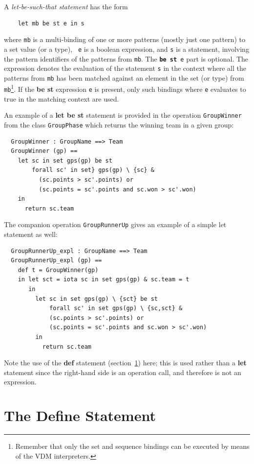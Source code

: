 \documentclass{overturerepchap}
\newcommand{\keyw}[1]{{\bf\ttfamily #1}}
\begin{document}
{\begin{description}
  A {\it let-be-such-that statement} has the form
  \begin{lstlisting}
    let mb be st e in s
  \end{lstlisting}
  where {\tt mb} is a multi-binding of one or more patterns (mostly
  just one pattern) to a set value (or a type), {\tt
    e} is a boolean expression, and {\tt s} is a statement, involving the
  pattern identifiers of the patterns from {\tt mb}. The {\tt \keyw{be st} e}
  part is optional. The expression denotes the evaluation of the statement
  {\tt s} in the context where all the patterns from {\tt mb} has been matched
  against an element in the set (or type) from {\tt mb}\footnote{Remember
    that only the set and sequence bindings can be executed by means of the
    VDM interpreters.}.
  If the \keyw{be st}
  expression {\tt e} is present, only such bindings where {\tt e} evaluates
  to true in the matching context are used.

\item[Examples:] An example of a \keyw{let be st} statement is provided in the
  operation \texttt{GroupWinner}
from the class \texttt{GroupPhase}
  which returns the winning team in a given group:
  \begin{lstlisting}
  GroupWinner : GroupName ==> Team
  GroupWinner (gp) ==
    let sc in set gps(gp) be st
        forall sc' in set} gps(gp) \ {sc} &
          (sc.points > sc'.points) or
          (sc.points = sc'.points and sc.won > sc'.won)
    in
      return sc.team
  \end{lstlisting}
  The companion operation \texttt{GroupRunnerUp} gives an example of a simple
  let statement as well:
  \begin{lstlisting}
  GroupRunnerUp_expl : GroupName ==> Team
  GroupRunnerUp_expl (gp) ==
    def t = GroupWinner(gp)
    in let sct = iota sc in set gps(gp) & sc.team = t
       in
         let sc in set gps(gp) \ {sct} be st
             forall sc' in set gps(gp) \ {sc,sct} &
             (sc.points > sc'.points) or
             (sc.points = sc'.points and sc.won > sc'.won)
         in
           return sc.team
  \end{lstlisting}
  Note the use of the {\bf\ttfamily def} statement (section~\ref{defstmt})
  here; this is used rather than a {\bf\ttfamily let} statement since the
  right-hand side is an operation call, and therefore is not an
  expression.

\end{description}

\section{The Define Statement}\label{defstmt}

}
\end{document}
